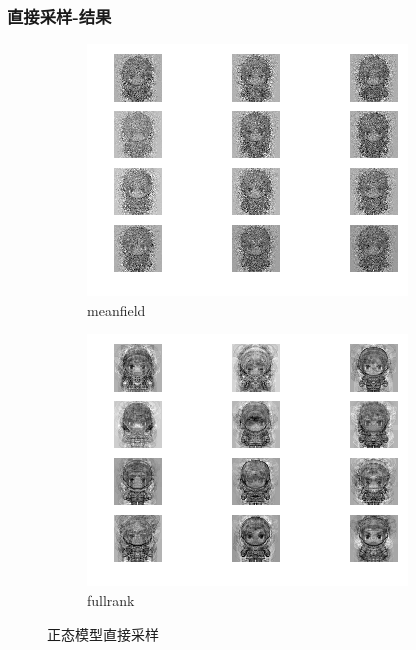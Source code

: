 \documentclass{beamer}
\begin{document}
\begin{frame}
\frametitle{直接采样-结果}

\begin{figure}[htb]
    \centering
    \begin{subfigure}[b]{0.3\linewidth}
        \includegraphics[width=\linewidth]{meanfield.png}
        \caption{meanfield}
      \end{subfigure}
      \begin{subfigure}[b]{0.3\linewidth}
        \includegraphics[width=\linewidth]{fullrank.png}
        \caption{fullrank}
      \end{subfigure}
      \caption{正态模型直接采样}
      \label{fig:meanfieldfullrank}
\end{figure}

\end{frame}
\end{document}
